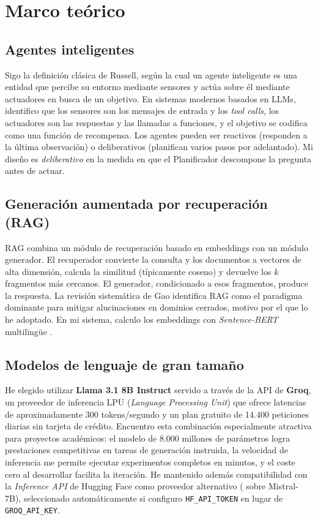 \documentclass[11pt,a4paper]{article}
\begin{document}
\section{Marco teórico}\label{sec:marco}

\subsection{Agentes inteligentes}

Sigo la definición clásica de Russell, según la cual un agente inteligente es una entidad que percibe su entorno mediante sensores y actúa sobre él mediante actuadores en busca de un objetivo. En sistemas modernos basados en LLMs, identifico que los sensores son los mensajes de entrada y los \emph{tool calls}, los actuadores son las respuestas y las llamadas a funciones, y el objetivo se codifica como una función de recompensa. Los agentes pueden ser reactivos (responden a la última observación) o deliberativos (planifican varios pasos por adelantado). Mi diseño es \emph{deliberativo} en la medida en que el Planificador descompone la pregunta antes de actuar.

\subsection{Generación aumentada por recuperación (RAG)}

RAG combina un módulo de recuperación basado en embeddings con un módulo generador. El recuperador convierte la consulta y los documentos a vectores de alta dimensión, calcula la similitud (típicamente coseno) y devuelve los $k$ fragmentos más cercanos. El generador, condicionado a esos fragmentos, produce la respuesta. La revisión sistemática de Gao identifica RAG como el paradigma dominante para mitigar alucinaciones en dominios cerrados, motivo por el que lo he adoptado. En mi sistema, calculo los embeddings con \emph{Sentence-BERT} multilingüe \cite{reimers2019sentence}.

\subsection{Modelos de lenguaje de gran tamaño}

He elegido utilizar \textbf{Llama 3.1 8B Instruct} servido a través de la API de \textbf{Groq}, un proveedor de inferencia LPU (\emph{Language Processing Unit}) que ofrece latencias de aproximadamente 300 tokens/segundo y un plan gratuito de 14.400 peticiones diarias sin tarjeta de crédito. Encuentro esta combinación especialmente atractiva para proyectos académicos: el modelo de 8.000 millones de parámetros logra prestaciones competitivas en tareas de generación instruida, la velocidad de inferencia me permite ejecutar experimentos completos en minutos, y el coste cero al desarrollar facilita la iteración. He mantenido además compatibilidad con la \emph{Inference API} de Hugging Face como proveedor alternativo (\cite{jiang2023mistral} sobre Mistral-7B), seleccionado automáticamente si configuro \texttt{HF\_API\_TOKEN} en lugar de \texttt{GROQ\_API\_KEY}.
\end{document}
